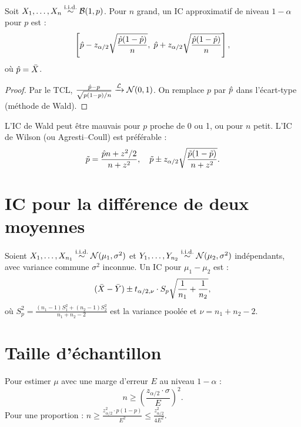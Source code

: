 \begin{theoreme}
Soit $X_1,\ldots,X_n\overset{\text{i.i.d.}}{\sim}\mathcal{B}(1,p)$. Pour $n$ grand, un IC approximatif de niveau $1-\alpha$ pour $p$ est :
\[
\left[\hat{p} - z_{\alpha/2}\sqrt{\frac{\hat{p}(1-\hat{p})}{n}},\;\hat{p} + z_{\alpha/2}\sqrt{\frac{\hat{p}(1-\hat{p})}{n}}\right],
\]
o\`u $\hat{p}=\bar{X}$.
\end{theoreme}

\begin{proof}
Par le TCL, $\frac{\hat{p}-p}{\sqrt{p(1-p)/n}}\xrightarrow{\mathcal{L}}\mathcal{N}(0,1)$. On remplace $p$ par $\hat{p}$ dans l'\'ecart-type (m\'ethode de Wald).
\end{proof}

\begin{attention}
L'IC de Wald peut \^etre mauvais pour $p$ proche de 0 ou 1, ou pour $n$ petit. L'IC de Wilson (ou Agresti--Coull) est pr\'ef\'erable :
\[
\tilde{p} = \frac{\hat{p} n + z^2/2}{n+z^2}, \quad \tilde{p}\pm z_{\alpha/2}\sqrt{\frac{\tilde{p}(1-\tilde{p})}{n+z^2}}.
\]
\end{attention}

\section{IC pour la diff\'erence de deux moyennes}

\begin{theoreme}
Soient $X_1,\ldots,X_{n_1}\overset{\text{i.i.d.}}{\sim}\mathcal{N}(\mu_1,\sigma^2)$ et $Y_1,\ldots,Y_{n_2}\overset{\text{i.i.d.}}{\sim}\mathcal{N}(\mu_2,\sigma^2)$ ind\'ependants, avec variance commune $\sigma^2$ inconnue. Un IC pour $\mu_1-\mu_2$ est :
\[
(\bar{X}-\bar{Y}) \pm t_{\alpha/2,\nu}\cdot S_p\sqrt{\frac{1}{n_1}+\frac{1}{n_2}},
\]
o\`u $S_p^2=\frac{(n_1-1)S_1^2+(n_2-1)S_2^2}{n_1+n_2-2}$ est la variance pool\'ee et $\nu=n_1+n_2-2$.
\end{theoreme}

\section{Taille d'\'echantillon}

\begin{proposition}
Pour estimer $\mu$ avec une marge d'erreur $E$ au niveau $1-\alpha$ :
\[
n \geq \left(\frac{z_{\alpha/2}\cdot\sigma}{E}\right)^2.
\]
Pour une proportion : $n\geq \frac{z_{\alpha/2}^2\cdot p(1-p)}{E^2}\leq \frac{z_{\alpha/2}^2}{4E^2}$.
\end{proposition}

